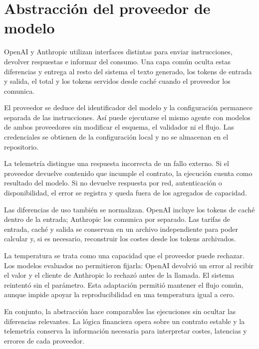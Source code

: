 \section{Abstracción del proveedor de modelo}
\label{sec:abstraccion_proveedor}

OpenAI y Anthropic utilizan interfaces distintas para enviar instrucciones, devolver respuestas e informar del consumo. Una capa común oculta estas diferencias y entrega al resto del sistema el texto generado, los tokens de entrada y salida, el total y los tokens servidos desde caché cuando el proveedor los comunica.

El proveedor se deduce del identificador del modelo y la configuración permanece separada de las instrucciones. Así puede ejecutarse el mismo agente con modelos de ambos proveedores sin modificar el esquema, el validador ni el flujo. Las credenciales se obtienen de la configuración local y no se almacenan en el repositorio.

La telemetría distingue una respuesta incorrecta de un fallo externo. Si el proveedor devuelve contenido que incumple el contrato, la ejecución cuenta como resultado del modelo. Si no devuelve respuesta por red, autenticación o disponibilidad, el error se registra y queda fuera de los agregados de capacidad.

Las diferencias de uso también se normalizan. OpenAI incluye los tokens de caché dentro de la entrada; Anthropic los comunica por separado. Las tarifas de entrada, caché y salida se conservan en un archivo independiente para poder calcular y, si es necesario, reconstruir los costes desde los tokens archivados.

La temperatura se trata como una capacidad que el proveedor puede rechazar. Los modelos evaluados no permitieron fijarla: OpenAI devolvió un error al recibir el valor y el cliente de Anthropic lo rechazó antes de la llamada. El sistema reintentó sin el parámetro. Esta adaptación permitió mantener el flujo común, aunque impide apoyar la reproducibilidad en una temperatura igual a cero.

En conjunto, la abstracción hace comparables las ejecuciones sin ocultar las diferencias relevantes. La lógica financiera opera sobre un contrato estable y la telemetría conserva la información necesaria para interpretar costes, latencias y errores de cada proveedor.
